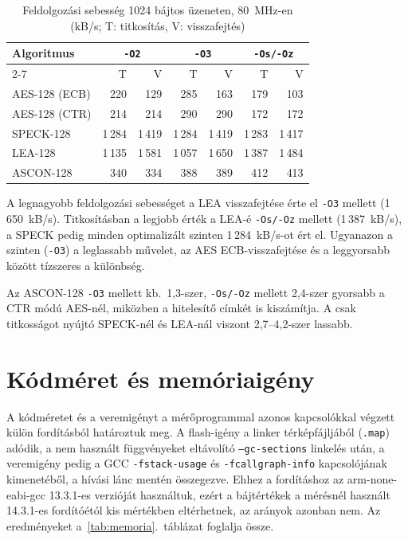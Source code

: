 \documentclass[a4paper,12pt]{report}
\theoremstyle{definition}
\theoremstyle{remark}
\begin{document}
\begin{table}[htbp]
    \centering
    \small
    \caption{Feldolgozási sebesség 1024 bájtos üzeneten, 80~MHz-en (kB/s; T: titkosítás, V: visszafejtés)}
    \label{tab:throughput}
    \begin{tabular}{|l|r|r|r|r|r|r|}
        \hline
        \textbf{Algoritmus} & \multicolumn{2}{c|}{\textbf{\texttt{-O2}}} & \multicolumn{2}{c|}{\textbf{\texttt{-O3}}} & \multicolumn{2}{c|}{\textbf{\texttt{-Os/-Oz}}} \\ \cline{2-7}
        & T & V & T & V & T & V \\ \hline
        AES-128 (ECB) & 220    & 129    & 285    & 163    & 179    & 103    \\ \hline
        AES-128 (CTR) & 214    & 214    & 290    & 290    & 172    & 172    \\ \hline
        SPECK-128     & 1\,284 & 1\,419 & 1\,284 & 1\,419 & 1\,283 & 1\,417 \\ \hline
        LEA-128       & 1\,135 & 1\,581 & 1\,057 & 1\,650 & 1\,387 & 1\,484 \\ \hline
        ASCON-128     & 340    & 334    & 388    & 389    & 412    & 413    \\ \hline
    \end{tabular}
\end{table}

A legnagyobb feldolgozási sebességet a LEA visszafejtése érte el \texttt{-O3} mellett (1\,650~kB/s). Titkosításban a legjobb érték a LEA-é \texttt{-Os/-Oz} mellett (1\,387~kB/s), a SPECK pedig minden optimalizált szinten 1\,284~kB/s-ot ért el. Ugyanazon a szinten (\texttt{-O3}) a leglassabb művelet, az AES ECB-visszafejtése és a leggyorsabb között tízszeres a különbség.

Az ASCON-128 \texttt{-O3} mellett kb.\ 1,3-szer, \texttt{-Os/-Oz} mellett 2,4-szer gyorsabb a CTR módú AES-nél, miközben a hitelesítő címkét is kiszámítja. A csak titkosságot nyújtó SPECK-nél és LEA-nál viszont 2,7--4,2-szer lassabb.

\section{Kódméret és memóriaigény}\label{sec:memoria}

A kódméretet és a veremigényt a mérőprogrammal azonos kapcsolókkal végzett külön fordításból határoztuk meg. A flash-igény a linker térképfájljából (\texttt{.map}) adódik, a nem használt függvényeket eltávolító \texttt{--gc-sections} linkelés után, a veremigény pedig a GCC \texttt{-fstack-usage} és \texttt{-fcallgraph-info} kapcsolójának kimenetéből, a hívási lánc mentén összegezve. Ehhez a fordításhoz az arm-none-eabi-gcc 13.3.1-es verzióját használtuk, ezért a bájtértékek a mérésnél használt 14.3.1-es fordítóétól kis mértékben eltérhetnek, az arányok azonban nem. %
Az eredményeket a~\ref{tab:memoria}.~táblázat foglalja össze.
\end{document}
